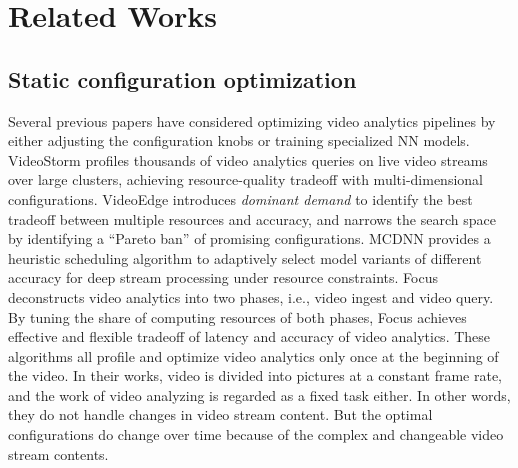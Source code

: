 \section{Related Works}
\label{Section: related_works}

\subsection{Static configuration optimization}
Several previous papers have considered optimizing video analytics pipelines by either adjusting the configuration knobs or training specialized NN models. VideoStorm \cite{zhang2017videostorm} profiles thousands of video analytics queries on live video streams over large clusters, achieving resource-quality tradeoff with multi-dimensional configurations. VideoEdge \cite{hung2018videoedge} introduces \emph{dominant demand} to identify the best tradeoff between multiple resources and accuracy, and narrows the search space by identifying a ``Pareto ban'' of promising configurations. MCDNN \cite{han2016mcdnn} provides a heuristic scheduling algorithm to adaptively select model variants of different accuracy for deep stream processing under resource constraints. Focus \cite{hsieh2018focus} deconstructs video analytics into two phases, i.e., video ingest and video query. By tuning the share of computing resources of both phases, Focus achieves effective and flexible tradeoff of latency and accuracy of video analytics. These algorithms all profile and optimize video analytics only once at the beginning of the video. In their works, video is divided into pictures at a constant frame rate, and the work of video analyzing is regarded as a fixed task either. In other words, they do not handle changes in video stream content. But the optimal configurations do change over time because of the complex and changeable video stream contents.

